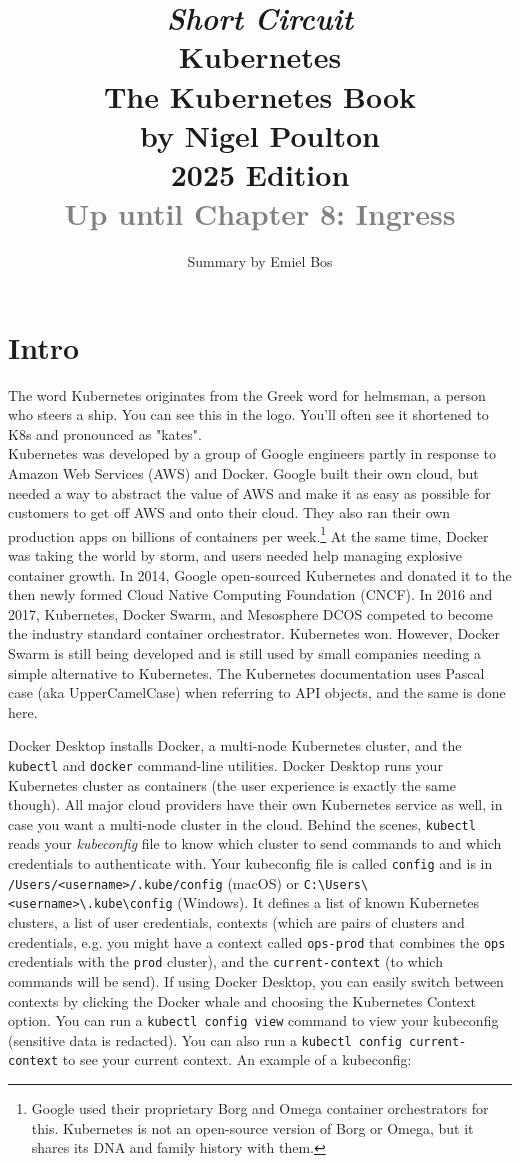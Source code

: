 \documentclass[8pt, table, xcdraw]{article}%
\title{
\textit{Short Circuit}\\
\vspace{15px}
\huge
Kubernetes\\
\vspace{20px}
\large
The Kubernetes Book\\
by Nigel Poulton\\
2025 Edition\\
\textcolor{gray}{Up until Chapter 8: Ingress}
}
\author{Summary by Emiel Bos}
\date{}
\begin{document}
\maketitle

\section{Intro}

The word Kubernetes originates from the Greek word for helmsman, a person who steers a ship. You can see this in the logo. You’ll often see it shortened to K8s and pronounced as "kates".\\
Kubernetes was developed by a group of Google engineers partly in response to Amazon Web Services (AWS) and Docker. Google built their own cloud, but needed a way to abstract the value of AWS and make it as easy as possible for customers to get off AWS and onto their cloud. They also ran their own production apps on billions of containers per week.\footnote{Google used their proprietary Borg and Omega container orchestrators for this. Kubernetes is not an open-source version of Borg or Omega, but it shares its DNA and family history with them.} At the same time, Docker was taking the world by storm, and users needed help managing explosive container growth. In 2014, Google open-sourced Kubernetes and donated it to the then newly formed Cloud Native Computing Foundation (CNCF).
In 2016 and 2017, Kubernetes, Docker Swarm, and Mesosphere DCOS competed to become the industry standard container orchestrator. Kubernetes won. However, Docker Swarm is still being developed and is still used by small companies needing a simple alternative to Kubernetes.
The Kubernetes documentation uses Pascal case (aka UpperCamelCase) when referring to API objects, and the same is done here.

Docker Desktop installs Docker, a multi-node Kubernetes cluster, and the \lstinline{kubectl} and \lstinline{docker} command-line utilities. Docker Desktop runs your Kubernetes cluster as containers (the user experience is exactly the same though). All major cloud providers have their own Kubernetes service as well, in case you want a multi-node cluster in the cloud. Behind the scenes, \lstinline{kubectl} reads your \emph{kubeconfig} file to know which cluster to send commands to and which credentials to authenticate with. Your kubeconfig file is called \lstinline{config} and is in \lstinline{/Users/<username>/.kube/config} (macOS) or \lstinline{C:\Users\<username>\.kube\config} (Windows). It defines a list of known Kubernetes clusters, a list of user credentials, contexts (which are pairs of clusters and credentials, e.g. you might have a context called \lstinline{ops-prod} that combines the \lstinline{ops} credentials with the \lstinline{prod} cluster), and the \lstinline{current-context}  (to which commands will be send). If using Docker Desktop, you can easily switch between contexts by clicking the
Docker whale and choosing the Kubernetes Context option. You can run a \lstinline{kubectl config view} command to view your kubeconfig (sensitive data is redacted). You can also run a \lstinline{kubectl config current-context} to see your current context. An example of a kubeconfig:
\end{document}
